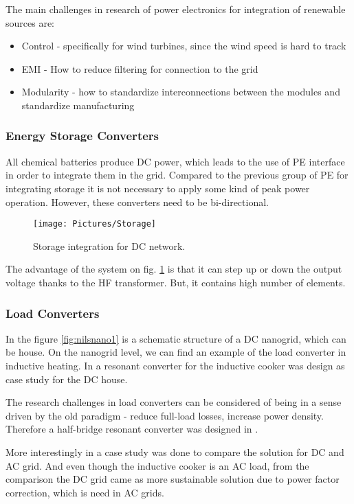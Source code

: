 \documentclass[]{scrartcl}
\begin{document}
The main challenges in research of power electronics for integration of renewable sources are: 
\begin{itemize}
	\item Control - specifically for wind turbines, since the wind speed is hard to track
	\item EMI - How to reduce filtering for connection to the grid
	\item Modularity - how to standardize interconnections between the modules and standardize manufacturing
\end{itemize}


\newpage
\subsubsection{Energy Storage Converters}

All chemical batteries produce DC power, which leads to the use of PE interface in order to integrate them in the grid. Compared to the previous group of PE for integrating storage it is not necessary to apply some kind of peak power operation. However, these converters need to be bi-directional.

\begin{figure}[h!]
	\centering
	\texttt{[image: Pictures/Storage]}
	\caption{Storage integration for DC network.}
	\label{fig:Storage}
\end{figure}

The advantage of the system on fig. \ref{fig:Storage} is that it can step up or down the output voltage thanks to the HF transformer. But, it contains high number of elements.


\subsubsection{Load Converters}

In the figure \ref{fig:nilsnano1} is a schematic structure of a DC nanogrid, which can be house. On the nanogrid level, we can find an example of the load converter in inductive heating.  In \cite{Lucia2013} a resonant converter for the inductive cooker was design as case study for the DC house. 

The research challenges in load converters can be considered of being in a sense driven by the old paradigm\cite{Kolar2009} - reduce full-load losses, increase power density. Therefore a half-bridge resonant converter was designed in \cite{Lucia2013}.  

More interestingly in \cite{Lucia2013} a case study was done to compare the solution for DC and AC grid. And even though the inductive cooker is an AC load, from the comparison the DC grid came as more sustainable solution due to power factor correction, which is need in AC grids.
\end{document}
